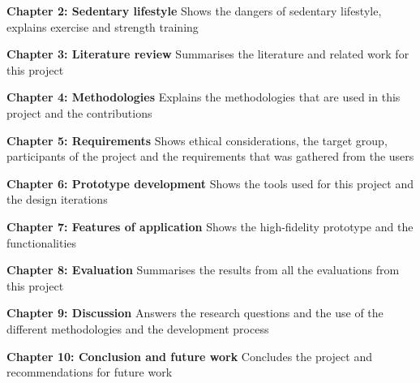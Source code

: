 \textbf{Chapter 2: Sedentary lifestyle} Shows the dangers of sedentary lifestyle, explains exercise and strength training

\textbf{Chapter 3: Literature review} Summarises the literature and related work for this project

\textbf{Chapter 4: Methodologies} Explains the methodologies that are used in this project and the contributions

\textbf{Chapter 5: Requirements} Shows ethical considerations, the target group, participants of the project and the requirements that was gathered from the users

\textbf{Chapter 6: Prototype development} Shows the tools used for this project and the design iterations 

\textbf{Chapter 7: Features of application} Shows the high-fidelity prototype and the functionalities

\textbf{Chapter 8: Evaluation} Summarises the results from all the evaluations from this project

\textbf{Chapter 9: Discussion} Answers the research questions and the use of the different methodologies and the development process

\textbf{Chapter 10: Conclusion and future work} Concludes the project and recommendations for future work




